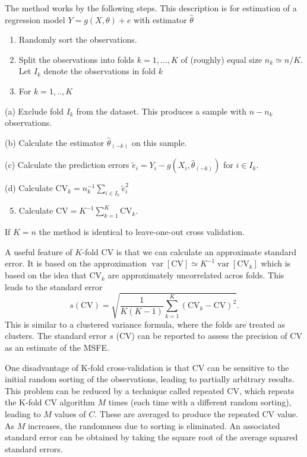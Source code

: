 \documentclass[10pt]{article}
\begin{document}
The method works by the following steps. This description is for estimation of a regression model $Y=g(X, \theta)+e$ with estimator $\widehat{\theta}$

\begin{enumerate}
  \item Randomly sort the observations.

  \item Split the observations into folds $k=1, \ldots, K$ of (roughly) equal size $n_{k} \simeq n / K$. Let $I_{k}$ denote the observations in fold $k$

  \item For $k=1, . ., K$

\end{enumerate}
(a) Exclude fold $I_{k}$ from the dataset. This produces a sample with $n-n_{k}$ observations.

(b) Calculate the estimator $\widehat{\theta}_{(-k)}$ on this sample.

(c) Calculate the prediction errors $\widetilde{e}_{i}=Y_{i}-g\left(X_{i}, \widehat{\theta}_{(-k)}\right)$ for $i \in I_{k}$.

(d) Calculate $\mathrm{CV}_{k}=n_{k}^{-1} \sum_{i \in I_{k}} \widetilde{e}_{i}^{2}$

\begin{enumerate}
  \setcounter{enumi}{4}
  \item Calculate $\mathrm{CV}=K^{-1} \sum_{k=1}^{K} \mathrm{CV}_{k}$.
\end{enumerate}
If $K=n$ the method is identical to leave-one-out cross validation.

A useful feature of $K$-fold CV is that we can calculate an approximate standard error. It is based on the approximation $\operatorname{var}[\mathrm{CV}] \simeq K^{-1} \operatorname{var}\left[\mathrm{CV}_{k}\right]$ which is based on the idea that $\mathrm{CV}_{k}$ are approximately uncorrelated acros folds. This leads to the standard error
$$
s(\mathrm{CV})=\sqrt{\frac{1}{K(K-1)} \sum_{k=1}^{K}\left(\mathrm{CV}_{k}-\mathrm{CV}\right)^{2}} .
$$
This is similar to a clustered variance formula, where the folds are treated as clusters. The standard error $s$ (CV) can be reported to assess the precision of CV as an estimate of the MSFE.

One disadvantage of K-fold cross-validation is that CV can be sensitive to the initial random sorting of the observations, leading to partially arbitrary results. This problem can be reduced by a technique called repeated CV, which repeats the K-fold CV algorithm $M$ times (each time with a different random sorting), leading to $M$ values of $C$. These are averaged to produce the repeated CV value. As $M$ increases, the randomness due to sorting is eliminated. An associated standard error can be obtained by taking the square root of the average squared standard errors.
\end{document}
